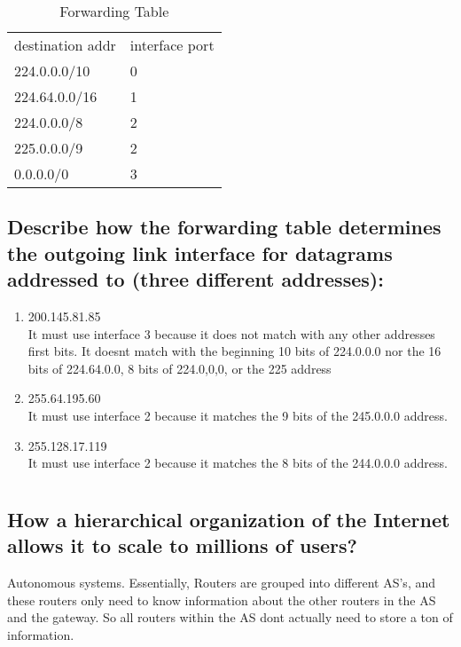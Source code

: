 \documentclass[10pt,letterpaper]{article}
\begin{document}
\begin{table}[h]
\centering
\caption{Forwarding Table}
\label{my-label}
\begin{tabular}{ll}
destination addr & interface port \\
224.0.0.0/10     & 0              \\
224.64.0.0/16    & 1              \\
224.0.0.0/8      & 2              \\
225.0.0.0/9      & 2              \\
0.0.0.0/0        & 3             
\end{tabular}
\end{table}

\subsection{Describe how the forwarding table determines the outgoing link interface for datagrams addressed to (three different addresses):}
\begin{enumerate}
  \item 200.145.81.85\\
  		It must use interface 3 because it does not match with any other addresses first bits. It doesnt match with the beginning 10 bits of 224.0.0.0 nor the 16 bits of 224.64.0.0, 8 bits of 224.0,0,0, or the 225 address
  		
  		
  \item 255.64.195.60\\
		It must use interface 2 because it matches the 9 bits of the 245.0.0.0 address.  
  
  \item 255.128.17.119\\
  		It must use interface 2 because it matches the 8 bits of the 244.0.0.0 address.
\end{enumerate}

\section{}
\subsection{How a hierarchical organization of the Internet allows it to scale to millions of users?}
Autonomous systems. Essentially, Routers are grouped into different AS's, and these routers only need to know information about the other routers in the AS and the gateway. So all routers within the AS dont actually need to store a ton of information.
\end{document}
